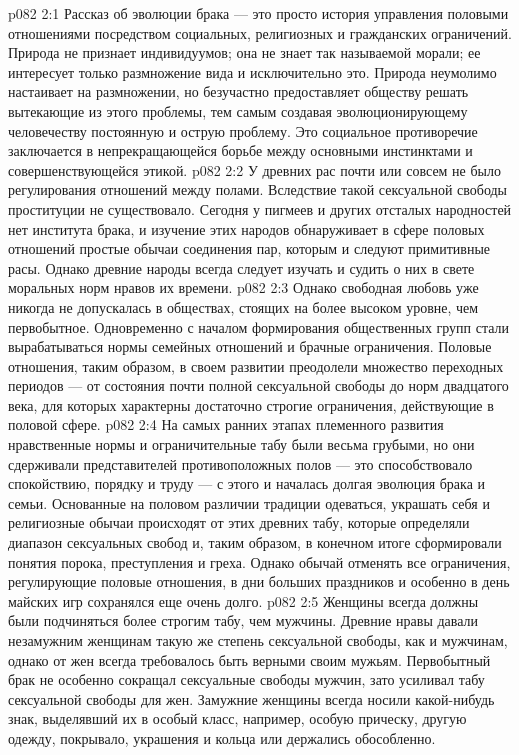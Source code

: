\vs p082 2:1 Рассказ об эволюции брака --- это просто история управления половыми отношениями посредством социальных, религиозных и гражданских ограничений. Природа не признает индивидуумов; она не знает так называемой морали; ее интересует только размножение вида и исключительно это. Природа неумолимо настаивает на размножении, но безучастно предоставляет обществу решать вытекающие из этого проблемы, тем самым создавая эволюционирующему человечеству постоянную и острую проблему. Это социальное противоречие заключается в непрекращающейся борьбе между основными инстинктами и совершенствующейся этикой.
\vs p082 2:2 \pc У древних рас почти или совсем не было регулирования отношений между полами. Вследствие такой сексуальной свободы проституции не существовало. Сегодня у пигмеев и других отсталых народностей нет института брака, и изучение этих народов обнаруживает в сфере половых отношений простые обычаи соединения пар, которым и следуют примитивные расы. Однако древние народы всегда следует изучать и судить о них в свете моральных норм нравов их времени.
\vs p082 2:3 Однако свободная любовь уже никогда не допускалась в обществах, стоящих на более высоком уровне, чем первобытное. Одновременно с началом формирования общественных групп стали вырабатываться нормы семейных отношений и брачные ограничения. Половые отношения, таким образом, в своем развитии преодолели множество переходных периодов --- от состояния почти полной сексуальной свободы до норм двадцатого века, для которых характерны достаточно строгие ограничения, действующие в половой сфере.
\vs p082 2:4 На самых ранних этапах племенного развития нравственные нормы и ограничительные табу были весьма грубыми, но они сдерживали представителей противоположных полов --- это способствовало спокойствию, порядку и труду --- с этого и началась долгая эволюция брака и семьи. Основанные на половом различии традиции одеваться, украшать себя и религиозные обычаи происходят от этих древних табу, которые определяли диапазон сексуальных свобод и, таким образом, в конечном итоге сформировали понятия порока, преступления и греха. Однако обычай отменять все ограничения, регулирующие половые отношения, в дни больших праздников и особенно в день майских игр сохранялся еще очень долго.
\vs p082 2:5 \pc Женщины всегда должны были подчиняться более строгим табу, чем мужчины. Древние нравы давали незамужним женщинам такую же степень сексуальной свободы, как и мужчинам, однако от жен всегда требовалось быть верными своим мужьям. Первобытный брак не особенно сокращал сексуальные свободы мужчин, зато усиливал табу сексуальной свободы для жен. Замужние женщины всегда носили какой\hyp{}нибудь знак, выделявший их в особый класс, например, особую прическу, другую одежду, покрывало, украшения и кольца или держались обособленно.
